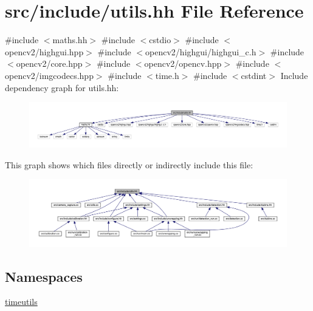 \hypertarget{utils_8hh}{}\section{src/include/utils.hh File Reference}
\label{utils_8hh}
{\ttfamily \#include $<$maths.\+hh$>$}\newline
{\ttfamily \#include $<$cstdio$>$}\newline
{\ttfamily \#include $<$opencv2/highgui.\+hpp$>$}\newline
{\ttfamily \#include $<$opencv2/highgui/highgui\+\_\+c.\+h$>$}\newline
{\ttfamily \#include $<$opencv2/core.\+hpp$>$}\newline
{\ttfamily \#include $<$opencv2/opencv.\+hpp$>$}\newline
{\ttfamily \#include $<$opencv2/imgcodecs.\+hpp$>$}\newline
{\ttfamily \#include $<$time.\+h$>$}\newline
{\ttfamily \#include $<$cstdint$>$}\newline
Include dependency graph for utils.\+hh\+:
\nopagebreak
\begin{figure}[H]
\begin{center}
\leavevmode
\includegraphics[width=350pt]{utils_8hh__incl}
\end{center}
\end{figure}
This graph shows which files directly or indirectly include this file\+:
\nopagebreak
\begin{figure}[H]
\begin{center}
\leavevmode
\includegraphics[width=350pt]{utils_8hh__dep__incl}
\end{center}
\end{figure}
\subsection*{Namespaces}
\begin{DoxyCompactItemize}
\item 
 \mbox{\hyperlink{namespacetimeutils}{timeutils}}
\end{DoxyCompactItemize}
